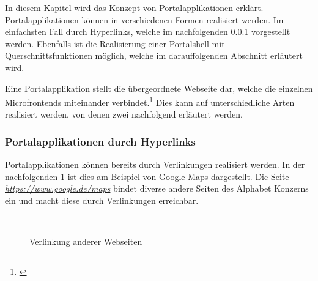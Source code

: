 In diesem Kapitel wird das Konzept von Portalapplikationen erklärt. Portalapplikationen können in verschiedenen Formen realisiert werden. Im einfachsten Fall durch Hyperlinks, welche im nachfolgenden \cref{sec:PortalapplikationenHyperlinks} vorgestellt werden. Ebenfalls ist die Realisierung einer Portalshell mit Querschnittsfunktionen möglich, welche im darauffolgenden Abschnitt erläutert wird.

Eine Portalapplikation stellt die übergeordnete Webseite dar, welche die einzelnen Microfrontends miteinander verbindet.\footnote{\cite[vgl.][121]{Geers2020}} Dies kann auf unterschiedliche Arten realisiert werden, von denen zwei nachfolgend erläutert werden.

\subsubsection{Portalapplikationen durch Hyperlinks}\label{sec:PortalapplikationenHyperlinks}

Portalapplikationen können bereits durch Verlinkungen realisiert werden. In der nachfolgenden \cref{fig:LinksMicroFrontends} ist dies am Beispiel von Google Maps dargestellt. Die Seite \textit{\url{https://www.google.de/maps}} bindet diverse andere Seiten des Alphabet Konzerns ein und macht diese durch Verlinkungen erreichbar.

\begin{figure}[hbt!]
	\centering
	\begin{minipage}[t]{0.5\textwidth}	
		\caption{Verlinkung anderer Webseiten}
		\\ %
		\label{fig:LinksMicroFrontends}
	\end{minipage}
\end{figure}

